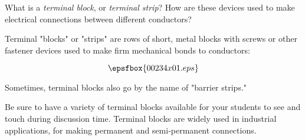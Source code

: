 

What is a {\it terminal block}, or {\it terminal strip}?  How are these devices used to make electrical connections between different conductors?







Terminal "blocks" or "strips" are rows of short, metal blocks with screws or other fastener devices used to make firm mechanical bonds to conductors:

$$\epsfbox{00234x01.eps}$$

Sometimes, terminal blocks also go by the name of "barrier strips."
 






Be sure to have a variety of terminal blocks available for your students to see and touch during discussion time.  Terminal blocks are widely used in industrial applications, for making permanent and semi-permanent connections.




